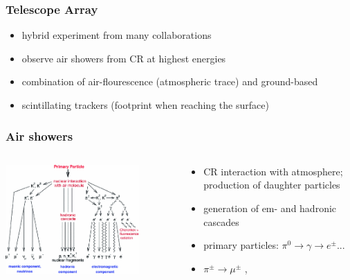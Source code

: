 \documentclass[aspectratio=1610, 9pt]{beamer}
\begin{document}
\begin{frame}\frametitle{Telescope Array}
  \begin{itemize}
    \item hybrid experiment from many collaborations
    \item observe air showers from CR at highest energies
    \item combination of air-flourescence (atmospheric trace) and ground-based
    \item scintillating trackers (footprint when reaching the surface)
  \end{itemize}
\end{frame}

\begin{frame}\frametitle{Air showers}
  \begin{columns}
    \begin{column}[c]{0.48\textwidth}
      \includegraphics[width=0.8\textwidth]{shower.png}
    \end{column}
    \begin{column}[c]{0.48\textwidth}
      \begin{itemize}
        \item CR interaction with atmosphere; production of daughter particles
        \item generation of em- and hadronic cascades
        \item primary particles: $\pi^0 \to \gamma \to e^{\pm}$...
        \item $\pi^{\pm} \to \mu^{\pm}$ , \nu
      \end{itemize}
    \end{column}
  \end{columns}
\end{frame}
\end{document}
